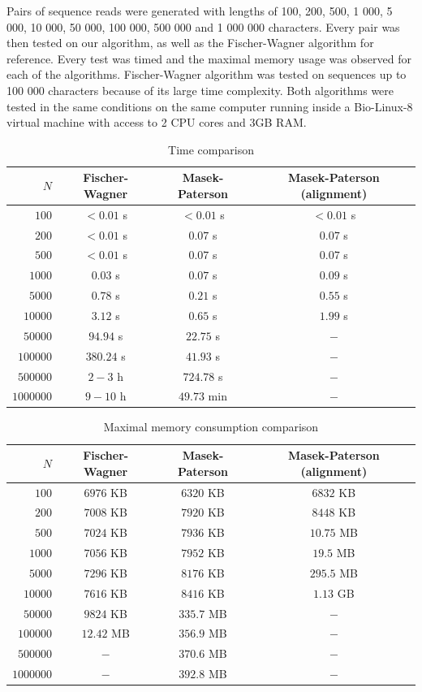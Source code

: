 \documentclass[times, utf8, seminar, numeric]{fer}
\begin{document}
Pairs of sequence reads were generated with lengths of 100, 200, 500, 1 000, 5 000, 10 000, 50 000, 100 000, 500 000 and 1 000 000 characters. Every pair was then tested on our algorithm, as well as the Fischer-Wagner algorithm for reference. Every test was timed and the maximal memory usage was observed for each of the algorithms. Fischer-Wagner algorithm was tested on sequences up to 100 000 characters because of its large time complexity. Both algorithms were tested in the same conditions on the same computer running inside a Bio-Linux-8 virtual machine with access to 2 CPU cores and 3GB RAM.
\begin{table}[h]
\centering
\begin{tabular}{rccc}
$N$ & Fischer-Wagner & Masek-Paterson & Masek-Paterson (alignment)\\
\hline
$      100 $&$ < 0.01$ s&$ <0.01$ s&$ <0.01 $ s \\
$      200 $&$ < 0.01$ s&$ 0.07$ s&$ 0.07$ s \\
$      500 $&$ < 0.01$ s&$ 0.07$ s&$ 0.07$ s\\
$    1 000 $&$ 0.03$ s&$ 0.07$ s&$ 0.09$ s\\
$    5 000 $&$ 0.78$ s&$ 0.21$ s&$ 0.55$ s\\
$   10 000 $&$ 3.12$ s&$ 0.65$ s&$ 1.99$ s\\
$   50 000 $&$ 94.94$ s&$ 22.75$ s&$ - $\footnotemark[2]\\
$  100 000 $&$ 380.24$ s&$ 41.93$ s&$ - $\footnotemark[2]\\
$  500 000 $&$ 2 - 3$ h\footnotemark[1] &$ 724.78$ s&$ - $\footnotemark[2]\\
$1 000 000 $&$ 9 - 10$ h\footnotemark[1] &$ 49.73$ min&$ - $\footnotemark[2]\\
\end{tabular}
\caption{Time comparison}
\end{table}
\begin{table}[h]
\centering
\begin{tabular}{rccc}
$N$ & Fischer-Wagner & Masek-Paterson & Masek-Paterson (alignment) \\
\hline
$      100 $&$ 6976$ KB &$ 6320$ KB &$ 6832$ KB \\
$      200 $&$ 7008$ KB &$ 7920$ KB &$ 8448$ KB \\
$      500 $&$ 7024$ KB &$ 7936$ KB &$ 10.75$ MB \\
$    1 000 $&$ 7056$ KB &$ 7952$ KB &$ 19.5$ MB\\
$    5 000 $&$ 7296$ KB &$ 8176$ KB &$ 295.5$ MB\\
$   10 000 $&$ 7616$ KB &$ 8416$ KB &$ 1.13$ GB\\
$   50 000 $&$ 9824$ KB &$ 335.7$ MB&$ - $\footnotemark[2]\\
$  100 000 $&$ 12.42$ MB &$ 356.9$ MB&$ - $\footnotemark[2]\\
$  500 000 $&$ -$\footnotemark[1]&$ 370.6$ MB&$ - $\footnotemark[2]\\
$1 000 000 $&$ -$\footnotemark[1]&$ 392.8$ MB&$ - $\footnotemark[2]\\
\end{tabular}
\caption{Maximal memory consumption comparison}
\end{table}
\end{document}
